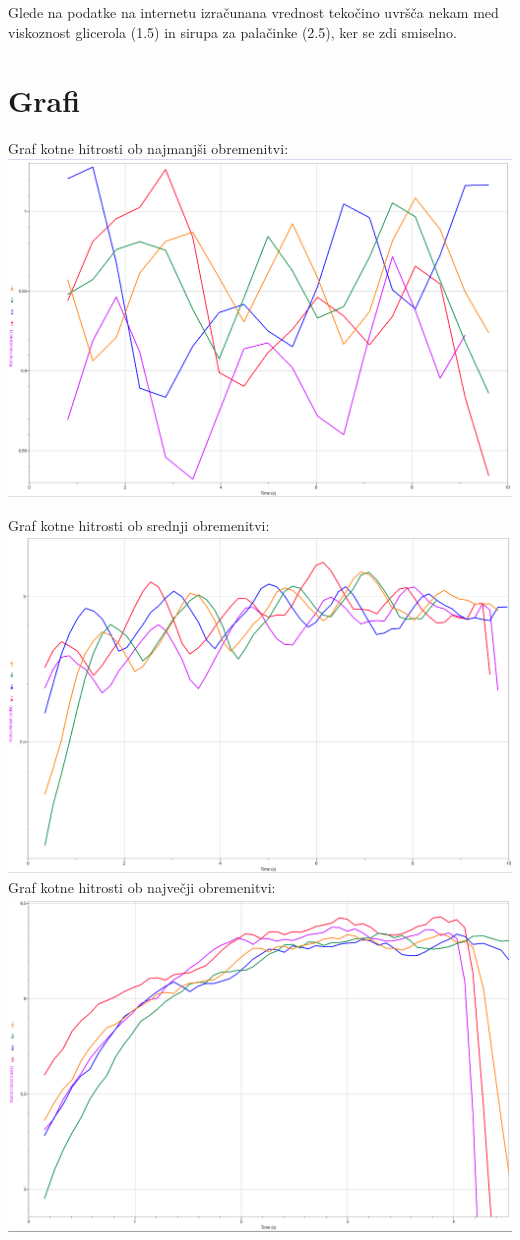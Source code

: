 \documentclass[a4paper]{report}
\begin{document}
\noindent Glede na podatke na internetu izračunana vrednost tekočino uvršča nekam med viskoznost glicerola (1.5) in sirupa za palačinke (2.5), ker se zdi smiselno.



\chapter*{Grafi}
Graf kotne hitrosti ob najmanjši obremenitvi:\\
\includegraphics[width=\textwidth]{majhna}\\
\pagebreak

Graf kotne hitrosti ob srednji obremenitvi:\\
\includegraphics[width=\textwidth]{srednja}\\

Graf kotne hitrosti ob največji obremenitvi:\\
\includegraphics[width=\textwidth]{velika}\\
\end{document}
